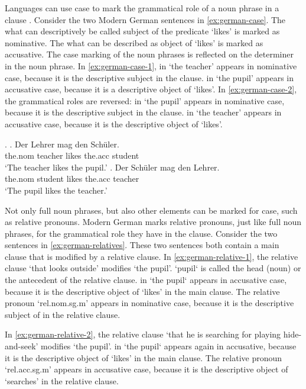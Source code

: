 Languages can use case to mark the grammatical role of a noun phrase in a clause \citep[cf.][]{moravcsik2009}. Consider the two Modern German sentences in \ref{ex:german-case}. The what can descriptively be called subject of the predicate  `likes' is marked as nominative. The what can be described as object of  `likes' is marked as accusative. The case marking of the noun phrases is reflected on the determiner in the noun phrase.
In \ref{ex:german-case-1},  in  `the teacher' appears in nominative case, because it is the descriptive subject in the clause.  in  `the pupil' appears in accusative case, because it is a descriptive object of  `likes'.
In \ref{ex:german-case-2}, the grammatical roles are reversed:  in  `the pupil' appears in nominative case, because it is the descriptive subject in the clause.  in  `the teacher' appears in accusative case, because it is the descriptive object of  `likes'.

\ex.\label{ex:german-case}
\ag. Der Lehrer mag den Schüler.\\
 the.\ac{nom} teacher likes the.\ac{acc} student\\
 `The teacher likes the pupil.'\label{ex:german-case-1}
\bg. Der Schüler mag den Lehrer.\\
 the.\ac{nom} student likes the.\ac{acc} teacher\\
 `The pupil likes the teacher.'\label{ex:german-case-2}

Not only full noun phrases, but also other elements can be marked for case, such as relative pronouns. Modern German marks relative pronouns, just like full noun phrases, for the grammatical role they have in the clause. Consider the two sentences in \ref{ex:german-relatives}. These two sentences both contain a main clause that is modified by a relative clause.
In \ref{ex:german-relative-1}, the relative clause  `that looks outside' modifies  `the pupil'.  `pupil` is called the head (noun) or the antecedent of the relative clause.  in  `the pupil` appears in accusative case, because it is the descriptive object of  `likes' in the main clause. The relative pronoun  `\ac{rel}.\ac{nom}.\ac{sg}.\ac{m}' appears in nominative case, because it is the descriptive subject of in the relative clause.

In \ref{ex:german-relative-2}, the relative clause  `that he is searching for playing hide-and-seek' modifies  `the pupil'.  in  `the pupil` appears again in accusative, because it is the descriptive object of  `likes' in the main clause. The relative pronoun  `\ac{rel}.\ac{acc}.\ac{sg}.\ac{m}' appears in accusative case, because it is the descriptive object of  `searches' in the relative clause.

